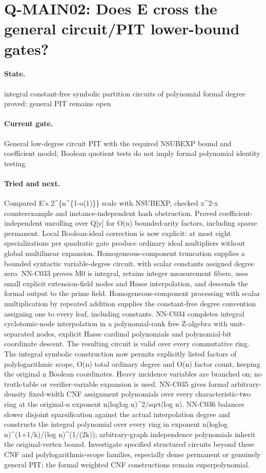 \section{Q-MAIN02: Does E cross the general circuit/PIT lower-bound gates?}
\paragraph{State.} integral constant-free symbolic partition circuits of polynomial formal degree proved; general PIT remains open
\paragraph{Current gate.} General low-degree circuit PIT with the required NSUBEXP bound and coefficient model; Boolean quotient tests do not imply formal polynomial identity testing.
\paragraph{Tried and next.} Compared E's 2\textasciicircum{}\{n\textasciicircum{}\{1-o(1)\}\} scale with NSUBEXP, checked x\textasciicircum{}2-x counterexample and instance-independent hash obstruction. Proved coefficient-independent unrolling over Q[y] for O(n) bounded-arity factors, including sparse permanent. Local Boolean-ideal correction is now explicit: at most eight specializations per quadratic gate produce ordinary ideal multipliers without global multilinear expansion. Homogeneous-component truncation supplies a bounded syntactic variable-degree circuit, with scalar constants assigned degree zero. NN-C033 proves M0 is integral, retains integer measurement fibers, uses small explicit extension-field nodes and Hasse interpolation, and descends the formal output to the prime field. Homogeneous-component processing with scalar multiplication by repeated addition supplies the constant-free degree convention assigning one to every leaf, including constants. NN-C034 completes integral cyclotomic-node interpolation in a polynomial-rank free Z-algebra with unit-separated nodes, explicit Hasse cardinal polynomials and polynomial-bit coordinate descent. The resulting circuit is valid over every commutative ring. The integral symbolic construction now permits explicitly listed factors of polylogarithmic scope, O(n) total ordinary degree and O(n) factor count, keeping the original n Boolean coordinates. Heavy incidence variables are branched on; no truth-table or verifier-variable expansion is used. NN-C035 gives formal arbitrary-density fixed-width CNF assignment polynomials over every characteristic-two ring at the original-n exponent n(loglog n)\textasciicircum{}2/sqrt(log n). NN-C036 balances slower disjoint sparsification against the actual interpolation degree and constructs the integral polynomial over every ring in exponent n(loglog n)\textasciicircum{}(1+1/k)/(log n)\textasciicircum{}(1/(2k)); arbitrary-graph independence polynomials inherit the original-vertex bound. Investigate specified structured circuits beyond these CNF and polylogarithmic-scope families, especially dense permanent or genuinely general PIT; the formal weighted CNF constructions remain superpolynomial.

